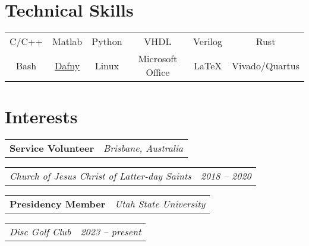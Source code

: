 \documentclass[letterpaper,12pt]{article}
\makeatletter
\def\fakesc#1{%
  \begingroup%
  \xdef\fake@name{\csname\curr@fontshape/\f@size\endcsname}%
  \fontsize{\fontdimen8\fake@name}{\baselineskip}\selectfont%
  \uppercase{#1}%
  \endgroup%
}
\newcommand{\simpleHeading}[2]{
    \vspace{-1pt}
    \begin{tabular*}{0.99\textwidth}[t]{l@{\extracolsep{\fill}}r}
        #1 & #2 \\
    \end{tabular*}
}
\newcommand{\positionHeading}[4]{
    \simpleHeading{\textbf{#1}}{\textit{#2}}
    \simpleHeading{\textit{#3}}{\textit{#4}}
}
\newcommand{\simpleParagraph}[1]{
    \vspace{-1pt}
    \begin{adjustwidth}{7pt}{0pt}
        #1
    \end{adjustwidth}
}
\newcommand{\matlab}[0]{
    Matlab
}
\makeatother
\begin{document}


    



\section{Technical Skills}
  \begin{adjustwidth}{0.15in}{0.0in}
    \begin{tabular*}{0.97\linewidth}{@{\extracolsep{\fill}} cccccc }
        C/C++
            & \matlab
            & Python & VHDL & Verilog & Rust
            \vspace{5pt} \\
       
        Bash
            & \href{https://dafny.org/}{Dafny}
            & Linux & Microsoft Office & \LaTeX & Vivado/Quartus
    \end{tabular*}
  \end{adjustwidth}


\section{Interests}
    \positionHeading{Service Volunteer}{Brisbane, Australia}
        {Church of Jesus Christ of Latter-day Saints}{2018 -- 2020}

    \positionHeading{Presidency Member}{Utah State University}
        {Disc Golf Club}{2023 -- present}




\end{document}
